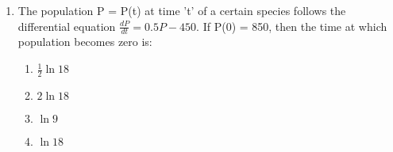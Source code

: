 \documentclass[journal]{IEEEtran}
\numberwithin{equation}{enumi}
\numberwithin{figure}{enumi}
\begin{document}
\begin{enumerate}
\begin{multicols}{4}
\begin{enumerate}
        \item $(3,1)$
    \end{enumerate}
    \end{multicols}
    \item The population P = P(t) at time 't' of a certain species follows the differential equation $\frac{dP}{dt} = 0.5P - 450$. If P(0) = 850, then the time at which population becomes zero is: \\
    \begin{multicols}{4}
    \begin{enumerate}
        \item $\frac{1}{2}\ln{18}$
        \item $2\ln{18}$
        \item $\ln{9}$
        \item $\ln{18}$
    \end{enumerate}
    \end{multicols}
\end{enumerate}
\end{document}
